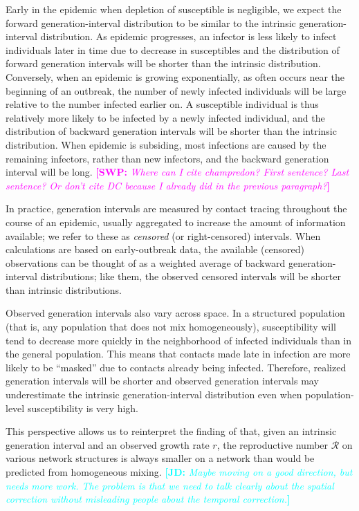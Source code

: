 \documentclass[12pt]{article}
\newcommand{\RR}{\ensuremath{{\mathcal R}}}
\newcommand{\comment}[3]{\textcolor{#1}{\textbf{[#2: }\textsl{#3}\textbf{]}}}
\newcommand{\jd}[1]{\comment{cyan}{JD}{#1}}
\newcommand{\swp}[1]{\comment{magenta}{SWP}{#1}}
\begin{document}
Early in the epidemic when depletion of susceptible is negligible, we expect the forward generation-interval distribution to be similar to the intrinsic generation-interval distribution.
As epidemic progresses, an infector is less likely to infect individuals later in time due to decrease in susceptibles and the distribution of forward generation intervals will be shorter than the intrinsic distribution.
Conversely, when an epidemic is growing exponentially, as often occurs near the beginning of an outbreak, the number of newly infected individuals will be large relative to the number infected earlier on. 
A susceptible individual is thus relatively more likely to be infected by a newly infected individual, and the distribution of backward generation intervals will be shorter than the intrinsic distribution.
When epidemic is subsiding, most infections are caused by the remaining infectors, rather than new infectors, and the backward generation interval will be long.
\swp{Where can I cite champredon? First sentence? Last sentence? Or don't cite DC because I already did in the previous paragraph?}

In practice, generation intervals are measured by contact tracing throughout the course of an epidemic, usually aggregated to increase the amount of information available; we refer to these as \emph{censored} (or right-censored) intervals.
When calculations are based on early-outbreak data, the available (censored) observations can be thought of as a weighted average of backward generation-interval distributions; like them, the observed censored intervals will be shorter than intrinsic distributions.

Observed generation intervals also vary across space.
In a structured population (that is, any population that does not mix homogeneously), susceptibility will tend to decrease more quickly in  the neighborhood of infected individuals than in the general population. 
This means that contacts made late in infection are more likely to be ``masked'' due to contacts already being infected.
Therefore, realized generation intervals will be shorter and observed generation intervals may underestimate the intrinsic generation-interval distribution even when population-level susceptibility is very high.

This perspective allows us to reinterpret the finding of \cite{trapman2016inferring} that, given an intrinsic generation interval and an observed growth rate $r$, the reproductive number $\RR$ on various network structures is always smaller on a network than would be predicted from homogeneous mixing.
\jd{Maybe moving on a good direction, but needs more work. The problem is that we need to talk clearly about the spatial correction without misleading people about the temporal correction.}
\end{document}
